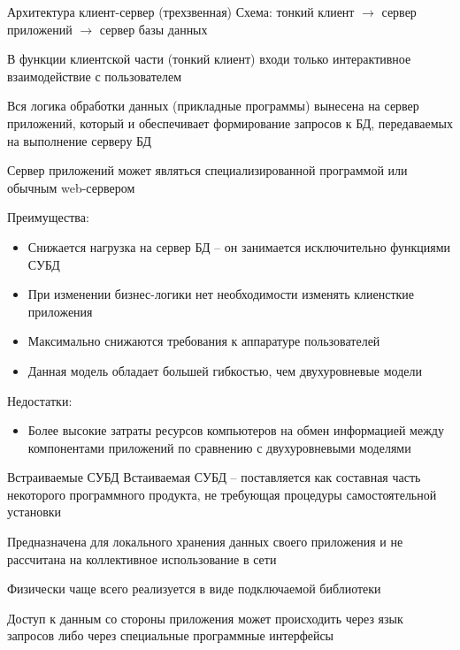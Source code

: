 \documentclass[12pt]{article}
\begin{document}
\begin{defin}{Архитектура клиент-сервер (трехзвенная)}
    Схема: тонкий клиент $\to$ сервер приложений $\to$ сервер базы данных 

    В функции клиентской части (тонкий клиент) входи только интерактивное взаимодействие с пользователем 

    Вся логика обработки данных (прикладные программы) вынесена на сервер приложений, который и обеспечивает формирование запросов к БД, передаваемых на выполнение серверу БД 

    Сервер приложений может являться специализированной программой или обычным web-сервером 

    Преимущества: 

    \begin{itemize}
        \item Снижается нагрузка на сервер БД -- он занимается исключительно функциями СУБД 
        \item При изменении бизнес-логики нет необходимости изменять клиенсткие приложения 
        \item Максимально снижаются требования к аппаратуре пользователей 
        \item Данная модель обладает большей гибкостью, чем двухуровневые модели 
    \end{itemize}

    Недостатки:

    \begin{itemize}
        \item Более высокие затраты ресурсов компьютеров на обмен информацией между компонентами приложений по сравнению с двухуровневыми моделями 
    \end{itemize}
\end{defin}

\begin{defin}{Встраиваемые СУБД}
    Встаиваемая СУБД -- поставляется как составная часть некоторого программного продукта, не требующая процедуры самостоятельной установки

    Предназначена для локального хранения данных своего приложения и не рассчитана на коллективное использование в сети 

    Физически чаще всего реализуется в виде подключаемой библиотеки 

    Доступ к данным со стороны приложения может происходить через язык запросов либо через специальные программные интерфейсы 
\end{defin}
\end{document}
